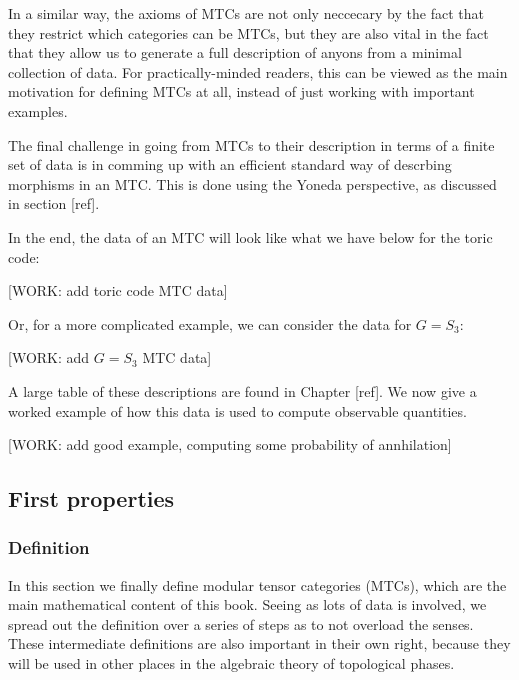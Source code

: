 \documentclass{article}
\theoremstyle{definition}
\numberwithin{figure}{section}
\begin{document}
In a similar way, the axioms of MTCs are not only neccecary by the fact that they restrict which categories can be MTCs, but they are also vital in the fact that they allow us to generate a full description of anyons from a minimal collection of data. For practically-minded readers, this can be viewed as the main motivation for defining MTCs at all, instead of just working with important examples.

The final challenge in going from MTCs to their description in terms of a finite set of data is in comming up with an efficient standard way of descrbing morphisms in an MTC. This is done using the Yoneda perspective, as discussed in section [ref].

In the end, the data of an MTC will look like what we have below for the toric code:

[WORK: add toric code MTC data]

Or, for a more complicated example, we can consider the data for $G=S_3$:

[WORK: add $G=S_3$ MTC data]

A large table of these descriptions are found in Chapter [ref]. We now give a worked example of how this data is used to compute observable quantities.

[WORK: add good example, computing some probability of annhilation]

\subsection{First properties}

\subsubsection{Definition}

In this section we finally define modular tensor categories (MTCs), which are the main mathematical content of this book. Seeing as lots of data is involved, we spread out the definition over a series of steps as to not overload the senses. These intermediate definitions are also important in their own right, because they will be used in other places in the algebraic theory of topological phases.
\end{document}
